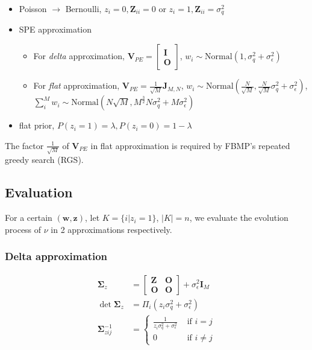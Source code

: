 \begin{itemize}
    \item Poisson $\rightarrow$ Bernoulli, $z_i=0,\bm{Z}_{ii}=0$ or $z_i=1,\bm{Z}_{ii}=\sigma_q^2$
    \item SPE approximation
    \begin{itemize}
    \item For \emph{delta} approximation, $\bm{V}_{PE}=\begin{bmatrix}\bm{I} \\\bm{O}\end{bmatrix}$, $w_i\sim \mathrm{Normal}(1,\sigma_q^2+\sigma_\epsilon^2)$
    \item For \emph{flat} approximation, $\bm{V}_{PE}=\frac{1}{\sqrt{M}}\bm{J}_{M,N}$, $w_i\sim \mathrm{Normal}(\frac{N}{\sqrt{M}},\frac{N}{\sqrt{M}}\sigma_q^2+\sigma_\epsilon^2)$, $\sum_i^M w_i\sim \mathrm{Normal}(N\sqrt{M},M^{\frac{3}{2}}N\sigma_q^2+M\sigma_\epsilon^2)$
    \end{itemize}
    \item flat prior, $P(z_i=1)=\lambda,P(z_i=0)=1-\lambda$
\end{itemize}

The factor $\frac{1}{\sqrt{M}}$ of $\bm{V}_{PE}$ in flat approximation is required by FBMP's repeated greedy search (RGS). 

\subsection{Evaluation}

For a certain $(\bm{w}, \bm{z})$, let $K=\{i|z_i=1\}$, $|K|=n$, we evaluate the evolution process of $\nu$ in 2 approximations respectively. 

\subsubsection{Delta approximation}

\begin{equation}
\begin{aligned}
    \bm{\Sigma}_z &= \begin{bmatrix}
        \bm{Z} & \bm{O} \\
        \bm{O} & \bm{O}
    \end{bmatrix} + \sigma_\epsilon^2\bm{I}_M \\
    \det\bm{\Sigma}_z &= \Pi_i (z_i\sigma_q^2+\sigma_\epsilon^2) \\
    \bm{\Sigma}_{zij}^{-1} &= \begin{cases}
        \frac{1}{z_i\sigma_q^2+\sigma_\epsilon^2} & \text{ if } i=j \\ 
        0 & \text{ if } i\neq j 
    \end{cases}
\end{aligned}
\end{equation}

